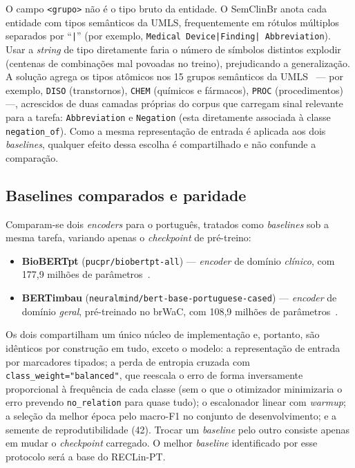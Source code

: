 \documentclass[12pt]{article}
\begin{document}
O campo \texttt{<grupo>} não é o tipo bruto da entidade. O SemClinBr anota cada
entidade com tipos semânticos da UMLS, frequentemente em rótulos múltiplos
separados por ``\texttt{|}'' (por exemplo, \texttt{Medical Device|Finding|%
Abbreviation}). Usar a \emph{string} de tipo diretamente faria o número de
símbolos distintos explodir (centenas de combinações mal povoadas no treino),
prejudicando a generalização. A solução agrega os tipos atômicos nos 15 grupos
semânticos da UMLS~\cite{mccray:01} --- por exemplo, \texttt{DISO} (transtornos),
\texttt{CHEM} (químicos e fármacos), \texttt{PROC} (procedimentos) ---,
acrescidos de duas camadas próprias do corpus que carregam sinal relevante para a
tarefa: \texttt{Abbreviation} e \texttt{Negation} (esta diretamente associada à
classe \texttt{negation\_of}). Como a mesma representação de entrada é aplicada
aos dois \emph{baselines}, qualquer efeito dessa escolha é compartilhado e não
confunde a comparação.

\subsection{Baselines comparados e paridade}
Comparam-se dois \emph{encoders} para o português, tratados como \emph{baselines}
sob a mesma tarefa, variando apenas o \emph{checkpoint} de pré-treino:
\begin{itemize}
  \item \textbf{BioBERTpt} (\texttt{pucpr/biobertpt-all}) --- \emph{encoder} de
  domínio \emph{clínico}, com 177,9 milhões de parâmetros~\cite{schneider:20}.
  \item \textbf{BERTimbau} (\texttt{neuralmind/bert-base-portuguese-cased}) ---
  \emph{encoder} de domínio \emph{geral}, pré-treinado no brWaC, com 108,9
  milhões de parâmetros~\cite{souza:20}.
\end{itemize}
Os dois compartilham um único núcleo de implementação e, portanto, são idênticos
por construção em tudo, exceto o modelo: a representação de entrada por
marcadores tipados; a perda de entropia cruzada com
\texttt{class\_weight="balanced"}, que reescala o erro de forma inversamente
proporcional à frequência de cada classe (sem o que o otimizador minimizaria o
erro prevendo \texttt{no\_relation} para quase tudo); o escalonador linear com
\emph{warmup}; a seleção da melhor época pelo macro-F1 no conjunto de
desenvolvimento; e a semente de reprodutibilidade (42). Trocar um \emph{baseline}
pelo outro consiste apenas em mudar o \emph{checkpoint} carregado. O melhor
\emph{baseline} identificado por esse protocolo será a base do RECLin-PT.
\end{document}
